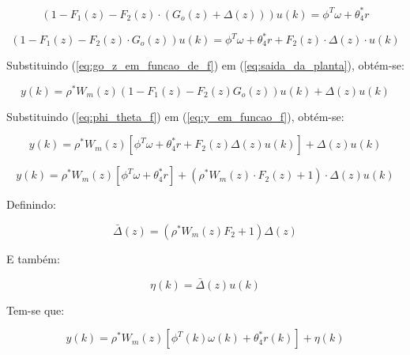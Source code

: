     \begin{equation*}
        \left( 1 - F_1(z) - F_2(z) \cdot \left( G_o(z) + \Delta(z) \right) \right) u(k) =
            \phi^T \omega + \theta_4^* r
    \end{equation*}

    \begin{equation}
        \left( 1 - F_1(z) - F_2(z) \cdot G_o(z) \right) u(k) = \phi^T \omega + \theta_4^* r +
            F_2(z) \cdot \Delta(z) \cdot u(k)
        \label{eq:phi_theta_f}
    \end{equation}

    Substituindo (\ref{eq:go_z_em_funcao_de_f}) em (\ref{eq:saida_da_planta}), obtém-se:

    \begin{equation}
        y(k) = \rho^* W_m(z) \left( 1 - F_1(z) - F_2(z) G_o(z) \right) u(k) + \Delta(z) u(k)
        \label{eq:y_em_funcao_f}
    \end{equation}

    Substituindo (\ref{eq:phi_theta_f}) em (\ref{eq:y_em_funcao_f}), obtém-se:

    \begin{equation*}
        y(k) = \rho^* W_m(z) \left[ \phi^T \omega + \theta_4^* r + F_2(z) \Delta(z) u(k) \right] + \Delta(z) u(k)
    \end{equation*}

    \begin{equation*}
        y(k) = \rho^* W_m(z) \left[ \phi^T \omega + \theta_4^* r \right] + \left( \rho^* W_m(z)
            \cdot F_2(z) + 1 \right) \cdot \Delta(z) u(k)
    \end{equation*}

    Definindo:

    \begin{equation*}
        \bar{\Delta}(z) = \left( \rho^* W_m(z) F_2 + 1 \right) \Delta(z)
    \end{equation*}

    E também:

    \begin{equation*}
        \eta(k) = \bar{\Delta}(z) u(k)
    \end{equation*}

    Tem-se que:

    \begin{equation*}
        y(k) = \rho^* W_m(z) \left[ \phi^T(k) \omega(k) + \theta_4^* r(k) \right] + \eta(k)
    \end{equation*}

